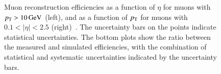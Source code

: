 \begin{figure}[htbp]
	\centering
	\hfill
	\caption[Muon reconstruction efficiencies as a function of $\eta$ for muons with $\pt>\SI{10}{\giga\electronvolt}$ (left), and as a function of $\pt$ for muons with $0.1<|\eta|<2.5$ (right). The uncertainty bars on the points indicate statistical uncertainties. The bottom plots show the ratio between the measured and simulated efficiencies, with the combination of statistical and systematic uncertainties indicated by the uncertainty bars.]{Muon reconstruction efficiencies as a function of $\eta$ for muons with $\pt>\SI{10}{\giga\electronvolt}$ (left), and as a function of $\pt$ for muons with $0.1<|\eta|<2.5$ (right)~\cite{TheATLASCollaboration:2014bm}. The uncertainty bars on the points indicate statistical uncertainties. The bottom plots show the ratio between the measured and simulated efficiencies, with the combination of statistical and systematic uncertainties indicated by the uncertainty bars.}
	\label{fig:reco-muon-efficiency}
\end{figure}


